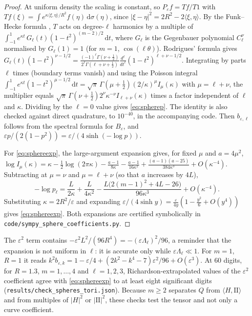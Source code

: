 \documentclass[11pt,a4paper]{article}
\theoremstyle{definition}\newtheorem{definition}[theorem]{Definition}
\theoremstyle{remark}\newtheorem{remark}[theorem]{Remark}
\newcommand{\eps}{\varepsilon}
\newcommand{\dd}{\,\mathrm d}
\newcommand{\II}{\mathrm{II}}
\begin{document}
\begin{proof}
At uniform density the scaling is constant, so $P_\eps f=Tf/T1$ with $Tf(\xi)=\int e^{\kappa\langle\xi,\eta\rangle/R^2}f(\eta)\dd\sigma(\eta)$, since $|\xi-\eta|^2=2R^2-2\langle\xi,\eta\rangle$. By the Funk--Hecke formula \cite{AtkinsonHan}, $T$ acts on degree-$\ell$ harmonics by a multiple of $\int_{-1}^1e^{\kappa t}\,G_\ell(t)(1-t^2)^{(m-2)/2}\dd t$, where $G_\ell$ is the Gegenbauer polynomial $C^{\nu}_\ell$ normalised by $G_\ell(1)=1$ (for $m=1$, $\cos(\ell\theta)$). Rodrigues' formula \cite{AtkinsonHan} gives $G_\ell(t)(1-t^2)^{\nu-1/2}=\frac{(-1)^\ell\Gamma(\nu+\frac12)}{2^\ell\Gamma(\ell+\nu+\frac12)}\frac{d^\ell}{dt^\ell}(1-t^2)^{\ell+\nu-1/2}$. Integrating by parts $\ell$ times (boundary terms vanish) and using the Poisson integral $\int_{-1}^1e^{\kappa t}(1-t^2)^{\mu-1/2}\dd t=\sqrt\pi\,\Gamma(\mu+\tfrac12)(2/\kappa)^\mu I_\mu(\kappa)$ \cite[10.32.2]{DLMF} with $\mu=\ell+\nu$, the multiplier equals $\sqrt\pi\,\Gamma(\nu+\tfrac12)2^\nu\kappa^{-\nu}I_{\ell+\nu}(\kappa)$ times a factor independent of $\ell$ and $\kappa$. Dividing by the $\ell=0$ value gives \eqref{eq:spherep}. The identity is also checked against direct quadrature, to $10^{-40}$, in the accompanying code. Then $b_{\eps,\ell}$ follows from the spectral formula for $B_\eps$, and $\eps p/(2(1-p^2))=\eps/(4\sinh(-\log p))$.

For \eqref{eq:sphereexp}, the large-argument expansion \cite[10.40.1]{DLMF} gives, for fixed $\mu$ and $a=4\mu^2$,
$\log I_\mu(\kappa)=\kappa-\tfrac12\log(2\pi\kappa)-\frac{a-1}{8\kappa}-\frac{a-1}{16\kappa^2}+\frac{(a-1)(a-25)}{384\kappa^3}+O(\kappa^{-4})$.
Subtracting at $\mu=\nu$ and $\mu=\ell+\nu$ (so that $a$ increases by $4L$),
\[
-\log p_\ell=\frac{L}{2\kappa}+\frac{L}{4\kappa^2}-\frac{L\bigl(2(m-1)^2+4L-26\bigr)}{96\kappa^3}+O(\kappa^{-4}).
\]
Substituting $\kappa=2R^2/\eps$ and expanding $\eps/(4\sinh y)=\frac\eps{4y}(1-\frac{y^2}6+O(y^4))$ gives \eqref{eq:sphereexp}. Both expansions are certified symbolically in \texttt{code/sympy\_sphere\_coefficients.py}.
\end{proof}

The $\eps^2$ term contains $-\eps^2L^2/(96R^4)=-(\eps\Lambda_\ell)^2/96$, a reminder that the expansion is not uniform in $\ell$: it is accurate only while $\eps\Lambda_\ell\ll1$. For $m=1$, $R=1$ it reads $k^2b_{\eps,k}=1-\eps/4+(2k^2-k^4-7)\eps^2/96+O(\eps^3)$. At $60$ digits, for $R=1.3$, $m=1,\dots,4$ and $\ell=1,2,3$, Richardson-extrapolated values of the $\eps^2$ coefficient agree with \eqref{eq:sphereexp} to at least eight significant digits (\texttt{results/check\_spheres\_tori.json}). Because $m\ge2$ separates $Q$ from $\langle H,\II\rangle$ and from multiples of $|H|^2$ or $|\II|^2$, these checks test the tensor and not only a curve coefficient.
\end{document}
